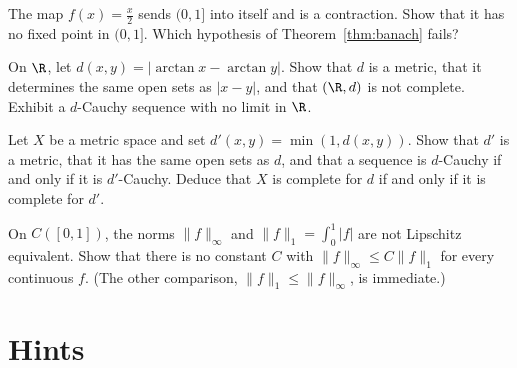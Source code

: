 \begin{exercise}[$\star$]\label{ex:v7c02a}
The map $f(x)=\frac x2$ sends $(0,1]$ into itself and is a contraction. Show that it has no fixed point in $(0,1]$. Which hypothesis of Theorem~\ref{thm:banach} fails?
\end{exercise}

\begin{exercise}[$\star$]\label{ex:v7c02b}
On $\R$, let $d(x,y)=|\arctan x-\arctan y|$. Show that $d$ is a metric, that it determines the same open sets as $|x-y|$, and that $(\R,d)$ is not complete. Exhibit a $d$-Cauchy sequence with no limit in $\R$.
\end{exercise}

\begin{exercise}[$\star\star$]\label{ex:v7c02c}
Let $X$ be a metric space and set $d'(x,y)=\min(1,d(x,y))$. Show that $d'$ is a metric, that it has the same open sets as $d$, and that a sequence is $d$-Cauchy if and only if it is $d'$-Cauchy. Deduce that $X$ is complete for $d$ if and only if it is complete for $d'$.
\end{exercise}

\begin{exercise}[$\star\star$]\label{ex:v7c02d}
On $C([0,1])$, the norms $\|f\|_\infty$ and $\|f\|_1=\int_0^1|f|$ are not Lipschitz equivalent. Show that there is no constant $C$ with $\|f\|_\infty\le C\|f\|_1$ for every continuous $f$. (The other comparison, $\|f\|_1\le\|f\|_\infty$, is immediate.)
\end{exercise}

\section{Hints}

